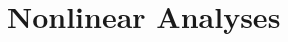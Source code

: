                       \chapter{Nonlinear Analyses} \label{chapter3}



%
\graphicspath{{figs/chapter3/PDF/}}






